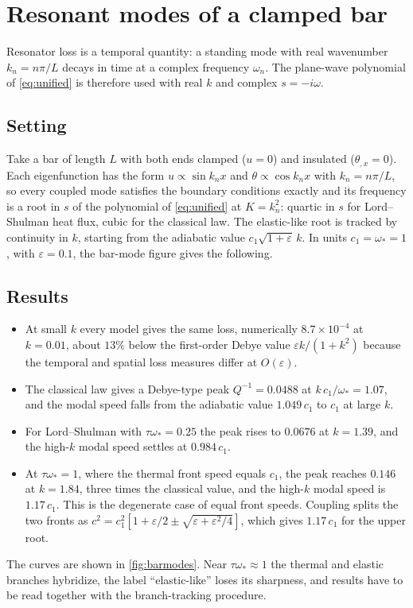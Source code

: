 \section{Resonant modes of a clamped bar}\label{sec:bar}

Resonator loss is a temporal quantity: a standing mode with real wavenumber $k_n=n\pi/L$ decays in time at a complex frequency $\omega_n$. The plane-wave polynomial of \cref{eq:unified} is therefore used with real $k$ and complex $s=-i\omega$.

\subsection{Setting}
Take a bar of length $L$ with both ends clamped ($u=0$) and insulated ($\theta_{,x}=0$). Each eigenfunction has the form $u\propto\sin k_nx$ and $\theta\propto\cos k_nx$ with $k_n=n\pi/L$, so every coupled mode satisfies the boundary conditions exactly and its frequency is a root in $s$ of the polynomial of \cref{eq:unified} at $K=k_n^2$: quartic in $s$ for Lord--Shulman heat flux, cubic for the classical law. The elastic-like root is tracked by continuity in $k$, starting from the adiabatic value $c_1\sqrt{1+\varepsilon}\,k$. In units $c_1=\omega_*=1$, with $\varepsilon=0.1$, the bar-mode figure gives the following.

\subsection{Results}
\begin{itemize}
\item At small $k$ every model gives the same loss, numerically $8.7\times10^{-4}$ at $k=0.01$, about $13\%$ below the first-order Debye value $\varepsilon k/(1+k^2)$ because the temporal and spatial loss measures differ at $O(\varepsilon)$.
\item The classical law gives a Debye-type peak $Q^{-1}=0.0488$ at $k\,c_1/\omega_*=1.07$, and the modal speed falls from the adiabatic value $1.049\,c_1$ to $c_1$ at large $k$.
\item For Lord--Shulman with $\tau\omega_*=0.25$ the peak rises to $0.0676$ at $k=1.39$, and the high-$k$ modal speed settles at $0.984\,c_1$.
\item At $\tau\omega_*=1$, where the thermal front speed equals $c_1$, the peak reaches $0.146$ at $k=1.84$, three times the classical value, and the high-$k$ modal speed is $1.17\,c_1$. This is the degenerate case of equal front speeds. Coupling splits the two fronts as $c^2=c_1^2[1+\varepsilon/2\pm\sqrt{\varepsilon+\varepsilon^2/4}]$, which gives $1.17\,c_1$ for the upper root.
\end{itemize}
The curves are shown in \cref{fig:barmodes}. Near $\tau\omega_*\approx1$ the thermal and elastic branches hybridize, the label ``elastic-like'' loses its sharpness, and results have to be read together with the branch-tracking procedure.

